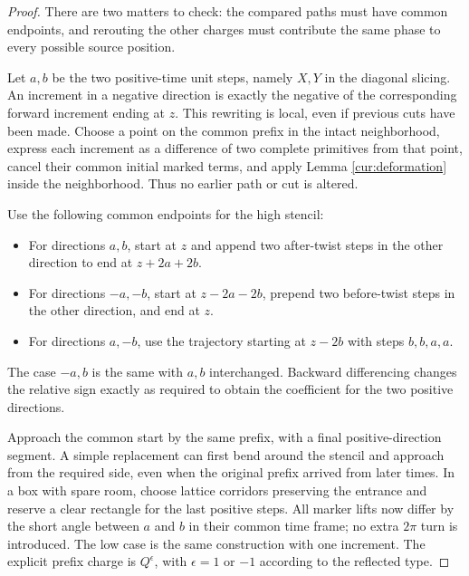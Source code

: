 \begin{proof}
There are two matters to check: the compared paths must have
common endpoints, and rerouting the other charges must contribute
the same phase to every possible source position.

Let $a,b$ be the two positive-time unit steps, namely $X,Y$ in
the diagonal slicing. An increment in a negative direction is
exactly the negative of the corresponding forward increment
ending at $z$. This rewriting is local, even if previous cuts
have been made. Choose a point on the common prefix in the
intact neighborhood, express each increment as a difference of
two complete primitives from that point, cancel their common
initial marked terms, and apply Lemma \ref{cur:deformation}
inside the neighborhood. Thus no earlier path or cut is altered.

Use the following common endpoints for the high stencil:
\begin{itemize}
\item For directions $a,b$, start at $z$ and append two
      after-twist steps in the other direction to end at
      $z+2a+2b$.
\item For directions $-a,-b$, start at $z-2a-2b$, prepend
      two before-twist steps in the other direction, and end
      at $z$.
\item For directions $a,-b$, use the trajectory starting at
      $z-2b$ with steps $b,b,a,a$.
\end{itemize}
The case $-a,b$ is the same with $a,b$ interchanged.
Backward differencing changes the relative sign exactly as
required to obtain the coefficient for the two positive
directions.

Approach the common start by the same prefix, with a final
positive-direction segment. A simple replacement can first bend
around the stencil and approach from the required side, even
when the original prefix arrived from later times. In a box
with spare room, choose lattice corridors preserving the
entrance and reserve a clear rectangle for the last positive
steps. All marker lifts now differ by the short angle between
$a$ and $b$ in their common time frame; no extra $2\pi$ turn
is introduced. The low case is the same construction with one
increment. The explicit prefix charge is $Q^\epsilon$, with
$\epsilon=1$ or $-1$ according to the reflected type.


\end{proof}
